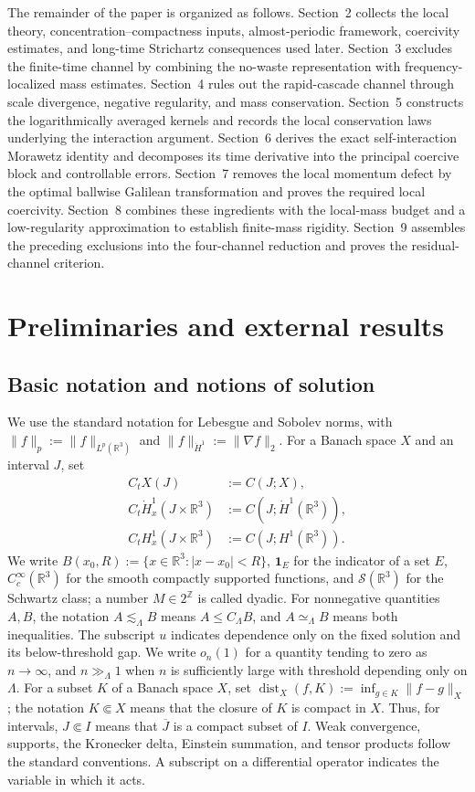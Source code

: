 \documentclass{interact}
\numberwithin{equation}{section}
\theoremstyle{plain}
\theoremstyle{definition}
\theoremstyle{remark}
\newcommand{\R}{\mathbb R}
\newcommand{\Sspace}{\mathcal S}
\newcommand{\one}{\mathbf 1}
\begin{document}
The remainder of the paper is organized as follows. Section~2 collects the local theory, concentration--compactness inputs, almost-periodic framework, coercivity estimates, and long-time Strichartz consequences used later. Section~3 excludes the finite-time channel by combining the no-waste representation with frequency-localized mass estimates. Section~4 rules out the rapid-cascade channel through scale divergence, negative regularity, and mass conservation. Section~5 constructs the logarithmically averaged kernels and records the local conservation laws underlying the interaction argument. Section~6 derives the exact self-interaction Morawetz identity and decomposes its time derivative into the principal coercive block and controllable errors. Section~7 removes the local momentum defect by the optimal ballwise Galilean transformation and proves the required local coercivity. Section~8 combines these ingredients with the local-mass budget and a low-regularity approximation to establish finite-mass rigidity. Section~9 assembles the preceding exclusions into the four-channel reduction and proves the residual-channel criterion. 

\section{Preliminaries and external results}

\subsection{Basic notation and notions of solution}

We use the standard notation for Lebesgue and Sobolev norms, with
$\|f\|_p:=\|f\|_{L^p(\R^3)}$ and $\|f\|_{\dot H^1}:=\|\nabla f\|_2$. For a Banach space $X$ and an interval $J$, set
\begin{align*}
 C_tX(J)&:=C(J;X),\\
 C_t\dot H_x^1(J\times\R^3)&:=C(J;\dot H^1(\R^3)),\\
 C_tH_x^1(J\times\R^3)&:=C(J;H^1(\R^3)).
\end{align*}
We write $B(x_0,R):=\{x\in\R^3:|x-x_0|<R\}$, $\one_E$ for the indicator of a set $E$, $C_c^\infty(\R^3)$ for the smooth compactly supported functions, and $\Sspace(\R^3)$ for the Schwartz class; a number $M\in2^{\mathbb Z}$ is called dyadic. For nonnegative quantities $A,B$, the notation $A\lesssim_\Lambda B$ means $A\le C_\Lambda B$, and $A\simeq_\Lambda B$ means both inequalities. The subscript $u$ indicates dependence only on the fixed solution and its below-threshold gap. We write $o_n(1)$ for a quantity tending to zero as $n\to\infty$, and $n\gg_\Lambda1$ when $n$ is sufficiently large with threshold depending only on $\Lambda$. For a subset $K$ of a Banach space $X$, set $\operatorname{dist}_X(f,K):=\inf_{g\in K}\|f-g\|_X$; the notation $K\Subset X$ means that the closure of $K$ is compact in $X$. Thus, for intervals, $J\Subset I$ means that $\overline J$ is a compact subset of $I$. Weak convergence, supports, the Kronecker delta, Einstein summation, and tensor products follow the standard conventions. A subscript on a differential operator indicates the variable in which it acts.
\end{document}
